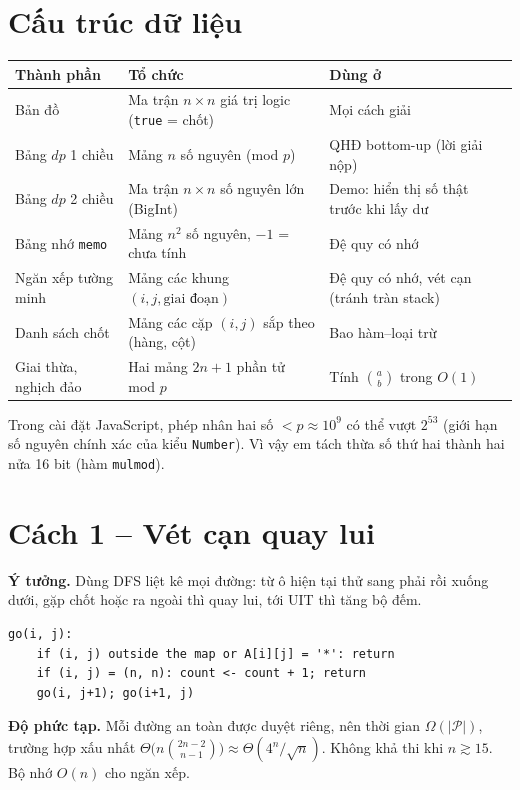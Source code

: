 \documentclass[12pt,a4paper]{report}
\begin{document}
\section{Cấu trúc dữ liệu}
\begin{center}
\begin{tabular}{p{4.3cm} p{5.6cm} p{4.6cm}}
\toprule
\textbf{Thành phần} & \textbf{Tổ chức} & \textbf{Dùng ở}\\\midrule
Bản đồ & Ma trận $n\times n$ giá trị logic (\texttt{true} = chốt) & Mọi cách giải\\
Bảng $dp$ 1 chiều & Mảng $n$ số nguyên (mod $p$) & QHĐ bottom-up (lời giải nộp)\\
Bảng $dp$ 2 chiều & Ma trận $n\times n$ số nguyên lớn (BigInt) & Demo: hiển thị số thật trước khi lấy dư\\
Bảng nhớ \texttt{memo} & Mảng $n^2$ số nguyên, $-1$ = chưa tính & Đệ quy có nhớ\\
Ngăn xếp tường minh & Mảng các khung $(i,j,\text{giai đoạn})$ & Đệ quy có nhớ, vét cạn (tránh tràn stack)\\
Danh sách chốt & Mảng các cặp $(i,j)$ sắp theo (hàng, cột) & Bao hàm--loại trừ\\
Giai thừa, nghịch đảo & Hai mảng $2n+1$ phần tử mod $p$ & Tính $\binom{a}{b}$ trong $O(1)$\\
\bottomrule
\end{tabular}
\end{center}
Trong cài đặt JavaScript, phép nhân hai số $<p\approx 10^9$ có thể vượt $2^{53}$ (giới hạn số nguyên chính xác của kiểu \texttt{Number}). Vì vậy em tách thừa số thứ hai thành hai nửa 16 bit (hàm \texttt{mulmod}).

\section{Cách 1 -- Vét cạn quay lui}
\textbf{Ý tưởng.} Dùng DFS liệt kê mọi đường: từ ô hiện tại thử sang phải rồi xuống dưới, gặp chốt hoặc ra ngoài thì quay lui, tới UIT thì tăng bộ đếm.
\begin{lstlisting}
go(i, j):
    if (i, j) outside the map or A[i][j] = '*': return
    if (i, j) = (n, n): count <- count + 1; return
    go(i, j+1); go(i+1, j)
\end{lstlisting}
\textbf{Độ phức tạp.} Mỗi đường an toàn được duyệt riêng, nên thời gian $\Omega(|\mathcal P|)$, trường hợp xấu nhất $\Theta\!\big(n\binom{2n-2}{n-1}\big) \approx \Theta(4^n/\sqrt n)$. Không khả thi khi $n\gtrsim 15$. Bộ nhớ $O(n)$ cho ngăn xếp.
\end{document}
